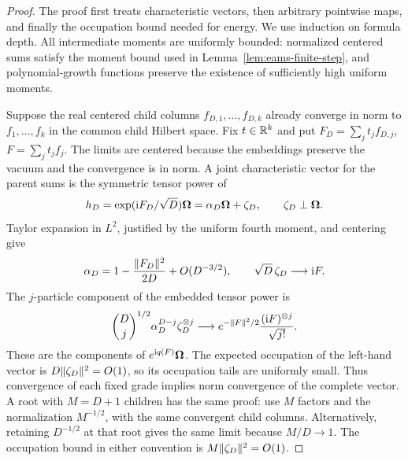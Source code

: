 \begin{proof}
The proof first treats characteristic vectors, then arbitrary
pointwise maps, and finally the occupation bound needed for energy.
We use induction on formula depth.  All intermediate
moments are uniformly bounded: normalized centered sums satisfy the
moment bound used in Lemma~\ref{lem:eams-finite-step}, and
polynomial-growth functions preserve the existence of sufficiently
high uniform moments.

Suppose the real centered child columns
$f_{D,1},\ldots,f_{D,k}$ already converge in norm to
$f_1,\ldots,f_k$ in the common child Hilbert space.  Fix
$t\in\mathbb R^k$ and put $F_D=\sum_jt_jf_{D,j}$,
$F=\sum_jt_jf_j$. The limits are centered because the embeddings
preserve the vacuum and the convergence is in norm.
A joint characteristic vector for the parent sums
is the symmetric tensor power of
\[
 h_D=\exp(\mathrm i F_D/\sqrt D)\boldsymbol\Omega
          =\alpha_D\boldsymbol\Omega+\zeta_D,
 \qquad \zeta_D\perp\boldsymbol\Omega.
\]
Taylor expansion in $L^2$, justified by the uniform fourth moment,
and centering give
\[
 \alpha_D=1-\frac{\lVert F_D\rVert^2}{2D}+O(D^{-3/2}),
 \qquad \sqrt D\,\zeta_D\longrightarrow\mathrm i F.
\]
The $j$-particle component of the embedded tensor power is
\[
 \binom Dj^{1/2}\alpha_D^{D-j}\zeta_D^{\otimes j}
 \longrightarrow
 e^{-\lVert F\rVert^2/2}\frac{(\mathrm i F)^{\otimes j}}{\sqrt{j!}}.
\]
These are the components of $e^{\mathrm i q(F)}\boldsymbol\Omega$.
The expected occupation of the left-hand vector is
$D\lVert \zeta_D\rVert^2=O(1)$, so its occupation tails are uniformly
small.  Thus convergence of each fixed grade implies norm convergence
of the complete vector.  A root with $M=D+1$ children has the same
proof: use $M$ factors and the normalization $M^{-1/2}$, with the
same convergent child columns.  Alternatively, retaining $D^{-1/2}$
at that root gives the same limit because $M/D\to1$.  The occupation
bound in either convention is $M\lVert \zeta_D\rVert^2=O(1)$.


\end{proof}
